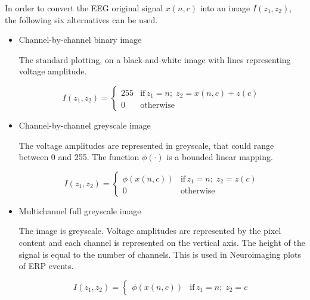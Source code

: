 

In order to convert the EEG original signal $x(n,c)$ into an image $I(z_1,z_2)$, the following six alternatives can be used.

\begin{itemize}
\item Channel-by-channel binary image

The standard plotting, on a black-and-white image with lines representing voltage amplitude.

\begin{equation}
I(z_1,z_2) = \left\{ \begin{array}{rl}
255 & \text{if} \,  z_1 =  n; \; z_2 = x(n,c) + z(c) \\
0   & \mbox{otherwise}
\end{array}\right.
\label{eq:images}
\end{equation}

\item Channel-by-channel greyscale image

The voltage amplitudes are represented in greyscale, that could range between 0 and 255.  The function $\phi( \cdot )$ is a bounded linear mapping.

\begin{equation}
I(z_1,z_2) = \left\{ \begin{array}{rl}
\phi(x(n,c)) & \text{if} \,  z_1 = n; \; z_2 = z(c) \\
0   & \mbox{otherwise}
\end{array}\right.
\label{eq:images}
\end{equation}

\item Multichannel full greyscale image

The image is greyscale. Voltage amplitudes are represented by the pixel content and each channel is represented on the vertical axis.  The height of the signal is equal to the number of channels.   This is used in Neuroimaging plots of ERP events.

\begin{equation}
I(z_1,z_2) = \left\{ \begin{array}{rl} \phi(x(n,c))  & \text{if} \,  z_1 = n; \; z_2 = c \end{array}\right.
\label{eq:images}
\end{equation}



\end{itemize}
